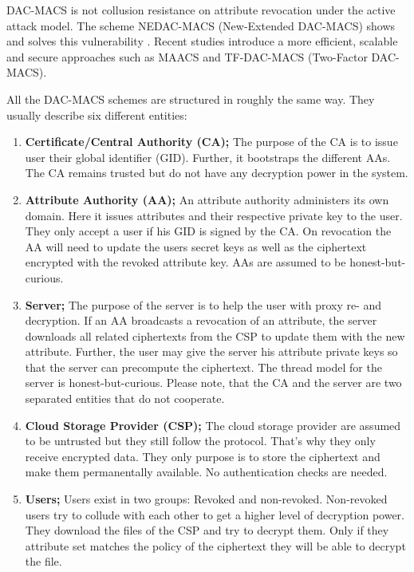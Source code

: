 \ac{DAC-MACS} is not collusion resistance on attribute revocation under the active attack model. The scheme \ac{NEDAC-MACS} (New-Extended \ac{DAC-MACS}) shows and solves this vulnerability \cite{wu2017security}. Recent studies introduce a more efficient, scalable and secure approaches such as \ac{MAACS} \cite{li2016secure} and \ac{TF-DAC-MACS} (Two-Factor \ac{DAC-MACS})\cite{li2017two}. 

All the \ac{DAC-MACS} schemes are structured in roughly the same way. They usually describe six different entities:

\begin{enumerate}
	\item \textbf{Certificate/Central Authority (\ac{CA});} The purpose of the \ac{CA} is to issue user their global identifier (\ac{GID}). Further, it bootstraps the different \ac{AA}s. The \ac{CA} remains trusted but do not have any decryption power in the system. 
	\item \textbf{Attribute Authority (\ac{AA});} An attribute authority administers its own domain. Here it issues attributes and their respective private key to the user. They only accept a user if his \ac{GID} is signed by the \ac{CA}. 
	On revocation the AA will need to update the users secret keys as well as the ciphertext encrypted with the revoked attribute key. \ac{AA}s are assumed to be honest-but-curious.
	\item \textbf{Server;} The purpose of the server is to help the user with proxy re- and decryption. If an \ac{AA} broadcasts a revocation of an attribute, the server downloads all related ciphertexts from the \ac{CSP} to update them with the new attribute. 
	Further, the user may give the server his attribute private keys so that the server can precompute the ciphertext. The thread model for the server is honest-but-curious. Please note, that the \ac{CA} and the server are two separated entities that do not cooperate.
	\item \textbf{Cloud Storage Provider (\ac{CSP});} The cloud storage provider are assumed to be untrusted but they still follow the protocol. That’s why they only receive encrypted data. They only purpose is to store the ciphertext and make them permanentally available. No authentication checks are needed.
	\item \textbf{Users;} Users exist in two groups: Revoked and non-revoked. Non-revoked users try to collude with each other to get a higher level of decryption power. They download the files of the \ac{CSP} and try to decrypt them. Only if they attribute set matches the policy of the ciphertext they will be able to decrypt the file. 

\end{enumerate}
